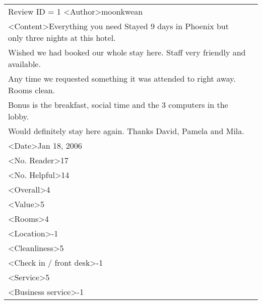\begin{longtable}{l |c|}

\hline
	
Review ID = 1
<Author>moonkwean\\
<Content>Everything you need Stayed 9 days in Phoenix but only three nights at this hotel.
\\Wished we had booked our whole stay here. Staff very friendly and available. 
\\Any time we requested something it was attended to right away. Rooms clean.
\\Bonus is the breakfast, social time and the 3 computers in the lobby.
\\ Would definitely stay here again. Thanks David, Pamela and Mila.\\
<Date>Jan 18, 2006\\
<No. Reader>17\\
<No. Helpful>14\\
<Overall>4\\
<Value>5\\
<Rooms>4\\
<Location>-1\\
<Cleanliness>5\\
<Check in / front desk>-1\\
<Service>5\\
<Business service>-1\\


\hline
\end{longtable}



